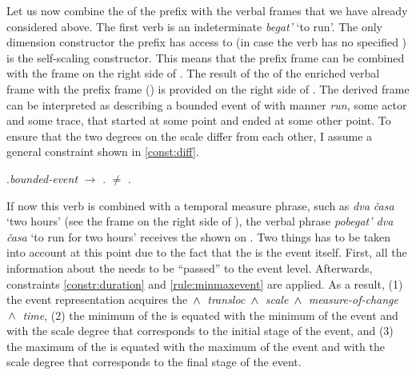 Let us now combine the  of the prefix  with the verbal frames that we have already considered above. The first verb is an indeterminate  \textit{begat'} `to run'. The only dimension constructor the prefix  has access to (in case the verb has no specified ) is the self-scaling constructor. This means that the prefix frame can be combined with the frame on the right side of . The result of the  of the enriched verbal frame with the prefix frame () is provided on the right side of . The derived frame can be interpreted as describing a bounded event of  with manner \textit{run}, some actor and some trace, that started at some point and ended at some other point. To ensure that the two degrees on the scale differ from each other, I assume a general constraint shown in \ref{const:diff}.

\ex.\label{const:diff}\textit{bounded-event} $\rightarrow$ \INIT.{\POS} $\neq$ \FIN.\POS

If now this verb is combined with a temporal measure phrase, such as \textit{dva \v{c}asa} `two hours' (see the frame on the right side of ), the verbal phrase \textit{pobegat' dva \v{c}asa} `to run for two hours' receives the  shown on . Two things has to be taken into account at this point due to the fact that the  is the event itself. First, all the information about the  needs to be ``passed'' to the event level. Afterwards, constraints \ref{constr:duration} and \ref{rule:minmaxevent} are applied. As a result, (1) the event representation acquires the  \textit{ $\,\wedge\,$ transloc $\,\wedge\,$ scale $\,\wedge\,$ measure-of-change $\,\wedge\,$ time}, (2) the minimum of the  is equated with the minimum of the event and with the scale degree that corresponds to the initial stage of the event, and (3) the maximum of the  is equated with the maximum of the event and with the scale degree that corresponds to the final stage of the event.

